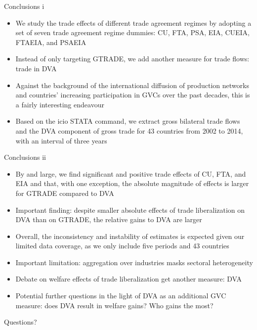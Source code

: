 \documentclass[10pt]{beamer}
\begin{document}
\begin{frame}{Conclusions i}
\begin{itemize}
    \item We study the trade effects of different trade agreement regimes by adopting a set of seven trade agreement regime dummies: CU, FTA, PSA, EIA, CUEIA, FTAEIA, and PSAEIA
    \item Instead of only targeting GTRADE, we add another measure for trade flows: trade in DVA 
    \item Against the background of the international diffusion of production networks and countries’ increasing participation in GVCs over the past decades, this is a fairly interesting endeavour 
    \item Based on the icio STATA command, we extract gross bilateral trade flows and the DVA component of gross trade for 43 countries from 2002 to 2014, with an interval of three years 
\end{itemize}
\end{frame}

\begin{frame}{Conclusions ii}
\begin{itemize}
    \item By and large, we find significant and positive trade effects of CU, FTA, and EIA and that, with one exception, the absolute magnitude of effects is larger for GTRADE compared to DVA
    \item Important finding: despite smaller absolute effects of trade liberalization on DVA than on GTRADE, the relative gains to DVA are larger 
    \item Overall, the inconsistency and instability of estimates is expected given our limited data coverage, as we only include five periods and 43 countries
    \item Important limitation: aggregation over industries masks sectoral heterogeneity 
    \item Debate on welfare effects of trade liberalization get another measure: DVA
    \item Potential further questions in the light of DVA as an additional GVC measure: does DVA result in welfare gains? Who gains the most? 
\end{itemize}
\end{frame}


\begin{frame}[standout]
  Questions?
\end{frame}
\end{document}
